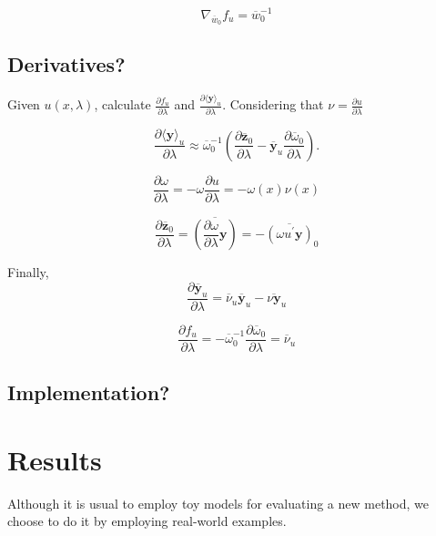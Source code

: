 \documentclass[journal=jctcce,manuscript=article,layout=twocolumn]{achemso}
\newcommand{\vt}[1]{\boldsymbol{\mathbf{#1}}}   %
\newcommand{\diff}[2]{\frac{\partial #1}{\partial #2}} %
\begin{document}
\begin{equation*}
\nabla_{\overline{w}_0}{f_u} = \overline{w}_0^{-1}
\end{equation*}


\subsection{Derivatives?}

Given $u(x,\lambda)$, calculate $\frac{\partial f_u}{\partial \lambda}$ and $\frac{\partial \langle \vt y \rangle_u}{\partial \lambda}$. Considering that $\nu = \diff{u}{\lambda}$

\begin{equation*}
\diff{\langle \vt y \rangle_u}{\lambda} \approx \overline{\omega}_0^{-1} \left( \diff{\overline{\vt z}_0}{\lambda} - \overline{\vt y}_u \diff{\overline{\omega}_0}{\lambda} \right).
\end{equation*}

\begin{equation*}
\diff{\omega}{\lambda} = -\omega \diff{u}{\lambda} = -\omega(x) \nu(x)
\end{equation*}


\begin{equation*}
\diff{\overline{\vt z}_0}{\lambda} = \overline{\left( \diff{\omega}{\lambda} \vt y \right)} = -\overline{(\omega u^\prime \vt y)}_0
\end{equation*}

Finally,
\begin{equation*}
\diff{\overline{\vt y}_u}{\lambda} = \overline{\nu}_u \overline{\vt y}_u - \overline{\nu \vt y}_u
\end{equation*}


\begin{equation*}
\diff{f_u}{\lambda} = -\overline{\omega}_0^{-1} \diff{\overline{\omega}_0}{\lambda} = \overline{\nu}_u
\end{equation*}

\subsection{Implementation?}


\section{Results}

Although it is usual to employ toy models for evaluating a new method, we choose to do it by employing real-world examples.
\end{document}
